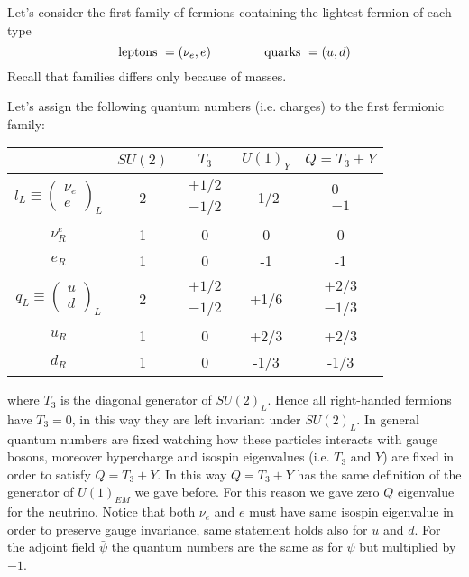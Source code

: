 \documentclass[TheoreticalPhy_ModB.tex]{subfiles}
\begin{document}
Let's consider the first family of fermions containing the lightest fermion of each type
\[\text{leptons }=(\nu_e,e)\hspace{1.5cm}\text{quarks }=(u,d)\]
Recall that families differs only because of masses. 

Let's assign the following quantum numbers (i.e. charges) to the first fermionic family:

\begin{table}[H]
\centering
\begin{tabular}{@{}||c||c|c|c|c||@{}}
\toprule
& $SU(2)$ & $T_3$ & $U(1)_Y$ & $Q=T_3+Y$ \\ \midrule\midrule
$l_L\equiv\begin{pmatrix}\nu_e\\e\end{pmatrix}_L$ & 2 & $\begin{matrix}+1/2\\-1/2\end{matrix}$ & -1/2 & $\begin{matrix}0\\-1\end{matrix}$ \\\midrule
$\nu^e_R$ & 1 & 0 & 0 & 0 \\\midrule
$e_R$ & 1 & 0 & -1 & -1 \\\midrule
$q_L\equiv\begin{pmatrix}u\\d\end{pmatrix}_L$ & 2 & $\begin{matrix}+1/2\\-1/2\end{matrix}$ & +1/6 & $\begin{matrix}+2/3\\-1/3\end{matrix}$ \\\midrule
$u_R$ & 1 & 0 & +2/3 & +2/3 \\ \midrule
$d_R$ & 1 & 0 & -1/3 & -1/3 \\ \bottomrule
\end{tabular}
\end{table}
%
\noindent
where $T_3$ is the diagonal generator of $SU(2)_L$. Hence all right-handed fermions have $T_3=0$, in this way they are left invariant under $SU(2)_L$.  In general quantum numbers are fixed watching how these particles interacts with gauge bosons, moreover hypercharge and isospin eigenvalues (i.e. $T_3$ and $Y$) are fixed in order to satisfy $Q=T_3+Y$. In this way $Q=T_3+Y$ has the same definition of the generator of $U(1)_{EM}$ we gave before. For this reason we gave zero $Q$ eigenvalue for the neutrino. Notice that both $\nu_e$ and $e$ must have same isospin eigenvalue in order to preserve gauge invariance, same statement holds also for $u$ and $d$. For the adjoint field $\bar\psi$ the quantum numbers are the same as for $\psi$ but multiplied by $-1$. 
\end{document}
